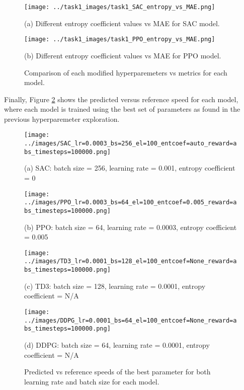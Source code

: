 \documentclass[11pt]{article}
\begin{document}
\begin{figure}[h!]
  \centering
  \begin{minipage}[b]{0.49\textwidth}
    \texttt{[image: ../task1\_images/task1\_SAC\_entropy\_vs\_MAE.png]}
    \caption*{(a) Different entropy coefficient values vs MAE for SAC model.}
  \end{minipage}
  \hfill
  \begin{minipage}[b]{0.49\textwidth}
    \texttt{[image: ../task1\_images/task1\_PPO\_entropy\_vs\_MAE.png]}
    \caption*{(b) Different entropy coefficient values vs MAE for PPO model.}
  \end{minipage}
  \caption{Comparison of each modified hyperparemeters vs metrics for each model.}
  \label{fig:ent_coef_vs_mae}
\end{figure}

Finally, Figure \ref{fig:pred_vs_ref} shows the predicted versus reference speed for each model, where each model is trained using the best set of parameters as found in the previous hyperparemeter exploration.

\begin{figure}[h!]
  \centering
  \begin{minipage}[b]{0.49\textwidth}
    \texttt{[image: ../images/SAC\_lr=0.0003\_bs=256\_el=100\_entcoef=auto\_reward=abs\_timesteps=100000.png]}
    \caption*{(a) SAC: batch size = 256, learning rate = 0.001, entropy coefficient = 0}
  \end{minipage}
  \hfill
  \begin{minipage}[b]{0.49\textwidth}
    \texttt{[image: ../images/PPO\_lr=0.0003\_bs=64\_el=100\_entcoef=0.005\_reward=abs\_timesteps=100000.png]}
    \caption*{(b) PPO: batch size = 64, learning rate = 0.0003, entropy coefficient = 0.005}
  \end{minipage}
  \begin{minipage}[b]{0.49\textwidth}
    \texttt{[image: ../images/TD3\_lr=0.0001\_bs=128\_el=100\_entcoef=None\_reward=abs\_timesteps=100000.png]}
    \caption*{(c) TD3: batch size = 128, learning rate = 0.0001, entropy coefficient = N/A}
  \end{minipage}
  \hfill
  \begin{minipage}[b]{0.49\textwidth}
    \texttt{[image: ../images/DDPG\_lr=0.0001\_bs=64\_el=100\_entcoef=None\_reward=abs\_timesteps=100000.png]}
    \caption*{(d) DDPG: batch size = 64, learning rate = 0.0001, entropy coefficient = N/A}
  \end{minipage}
  \caption{Predicted vs reference speeds of the best parameter for both learning rate and batch size for each model.}
  \label{fig:pred_vs_ref}
\end{figure}
\end{document}
